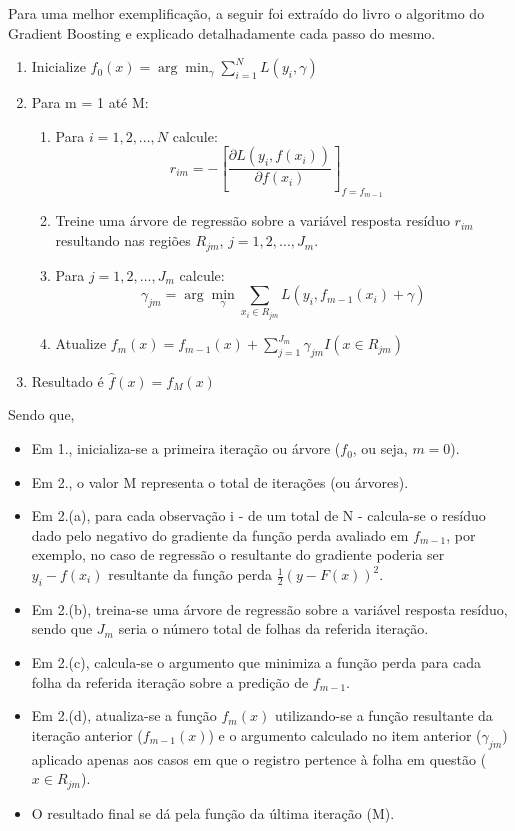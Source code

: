 Para uma melhor exemplificação, a seguir foi extraído do livro \citet{Hastie2001} o algoritmo do Gradient Boosting e explicado detalhadamente cada passo do mesmo.

\begin{enumerate}
	\item Inicialize $ f_0(x) = \arg \min_{\gamma} \sum^{N}_{i=1} L(y_i, \gamma) $
	\item Para m = 1 até M:
	\begin{enumerate}
    	\item Para $ i = 1,2,...,N $ calcule:
        	\begin{equation}
        	    r_{im} = -\left[\frac{\partial L(y_i, f(x_i))}{\partial f(x_i)}\right]_{f=f_{m-1}} \quad
        	\end{equation}
    	\item Treine uma árvore de regressão sobre a variável resposta resíduo $ r_{im} $ resultando nas regiões $ R_{jm} $, $ j = 1,2,...,J_m $.
    	\item Para $ j = 1,2,...,J_m $ calcule:
    	    \begin{equation}
    	        \gamma_{jm} = \arg \min_{\gamma} \sum_{x_i \in R_{jm}} L(y_i, f_{m-1}(x_i) + \gamma)
    	    \end{equation}
    	\item Atualize $ f_{m}(x) = f_{{m-1}}(x)+ \sum_{j=1}^{J_m} \gamma_{jm} I(x \in R_{jm}) $
	\end{enumerate}
	\item Resultado é $ \hat{f}(x) = f_M(x) $
\end{enumerate}

Sendo que,

\begin{itemize}
	\item Em 1., inicializa-se a primeira iteração ou árvore ($ f_0 $, ou seja, $ m=0 $).
	\item Em 2., o valor M representa o total de iterações (ou árvores).
	\item Em 2.(a), para cada observação i - de um total de N - calcula-se o resíduo dado pelo negativo do gradiente da função perda avaliado em $ f_{m-1} $, por exemplo, no caso de regressão o resultante do gradiente poderia ser $ y_i - f(x_i) $ resultante da função perda $ \frac{1}{2} (y - F(x))^{2} $.
	\item Em 2.(b), treina-se uma árvore de regressão sobre a variável resposta resíduo, sendo que $ J_m $ seria o número total de folhas da referida iteração.
	\item Em 2.(c), calcula-se o argumento que minimiza a função perda para cada folha da referida iteração sobre a predição de $ f_{m-1} $.
	\item Em 2.(d), atualiza-se a função $ f_m(x) $ utilizando-se a função resultante da iteração anterior ($ f_{m-1}(x) $) e o argumento calculado no item anterior ($ \gamma_{jm} $) aplicado apenas aos casos em que o registro pertence à folha em questão ($ x \in R_{jm} $).
	\item O resultado final se dá pela função da última iteração (M).
\end{itemize}

